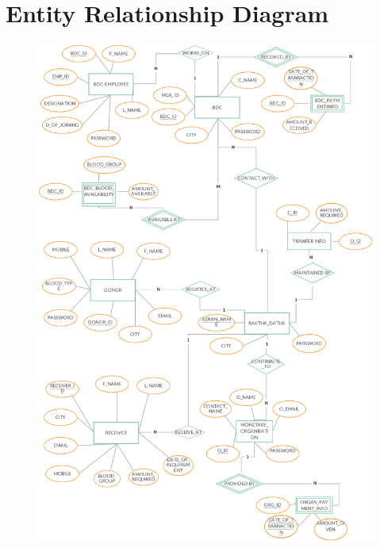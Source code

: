 \section{Entity Relationship Diagram}
\begin{figure}[htb]
\centering
\includegraphics[scale=0.3]{./er} %
\label{fig:label} %
\end{figure}

